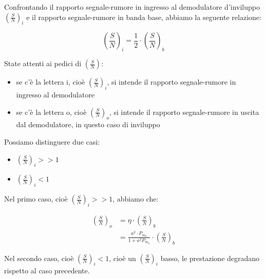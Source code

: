 Confrontando il rapporto segnale-rumore in ingresso al demodulatore d'inviluppo $\left( \frac{S}{N}\right)_{i}$ e 
il rapporto segnale-rumore in banda base, abbiamo la seguente relazione: 

{
    \Large 
    \begin{equation}
        \left( \frac{S}{N}\right)_{i}
        = 
        \frac{1}{2}
        \cdot 
        \left( \frac{S}{N}\right)_{b} 
    \end{equation}
}

\begin{tcolorbox}
    State attenti ai pedici di $\left( \frac{S}{N}\right)$: 
    \begin{itemize}
        \item se c'è la lettera i, cioè $\left( \frac{S}{N}\right)_i$, si intende il rapporto segnale-rumore in ingresso al demodulatore
        \item se c'è la lettera o, cioè $\left( \frac{S}{N}\right)_o$, si intende il rapporto segnale-rumore in uscita dal demodulatore, in questo caso di inviluppo
    \end{itemize}
\end{tcolorbox}

Possiamo distinguere due casi: 

\begin{itemize}
    \item $\left(\frac{S}{N} \right)_{i} >> 1$
    \item $\left(\frac{S}{N} \right)_{i} < 1$
\end{itemize}

Nel primo caso, cioè $\left(\frac{S}{N} \right)_{i} >> 1$, 
abbiamo che: 

{
    \Large 
    \begin{equation}
        \begin{split}
            \left(
                \frac{S}{N}
            \right)_{o}
            &= 
            \eta \cdot \left( \frac{S}{N}\right)_{b}
            \\
            &= 
            \frac{a^{2} \cdot P_{m_n}}{1 + a^{2} P_{m_n}}
            \cdot 
            \left( \frac{S}{N}\right)_{b}
        \end{split}
    \end{equation}
}

Nel secondo caso, cioè $\left(\frac{S}{N} \right)_{i} < 1$, cioè un $\left(\frac{S}{N} \right)_{i} $ basso, 
le prestazione degradano rispetto al caso precedente. \newline 


